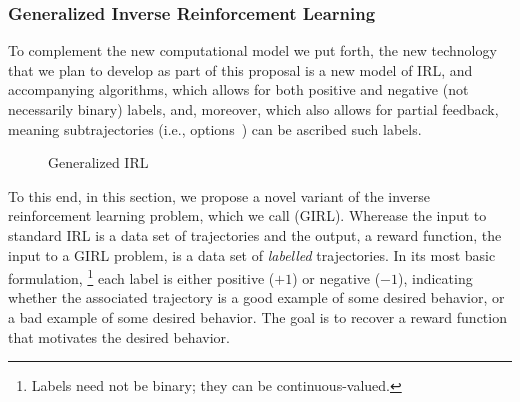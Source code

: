 
\subsubsection*{\large Generalized Inverse Reinforcement Learning}
\label{sec:girl}

To complement the new computational model we put forth, the new
technology that we plan to develop as part of this proposal is a new
model of IRL, and accompanying algorithms, which allows for both
positive and negative (not necessarily binary) labels, and, moreover,
which also allows for partial feedback, meaning subtrajectories (i.e.,
options~\cite{sutton99}) can be ascribed such labels.

\begin{wrapfigure}{l}{0.366\textwidth}
\caption{Generalized IRL}
\label{fig:girl}
\end{wrapfigure}

To this end, in this section, we propose a novel variant of the
inverse reinforcement learning problem, which we call
 (GIRL).  Wherease the input to standard IRL is
a data set of trajectories
and the output, a reward function, the input to a GIRL problem, is a
data set of \emph{labelled\/} trajectories. 
In its most basic formulation,%
\footnote{Labels need not be binary; they can be continuous-valued.}
each label is either positive ($+1$) or negative ($-1$), indicating
whether the associated trajectory is a good example of some desired
behavior, or a bad example of some desired behavior.  The goal is to
recover a reward function that motivates the desired behavior.

